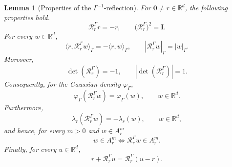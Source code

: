 \documentclass[aap]{imsart}
\theoremstyle{plain}
\newtheorem{lemma}[theorem]{Lemma}
\theoremstyle{definition}
\begin{document}
\begin{lemma}[Properties of the \(\Gamma^{-1}\)-reflection]\label{reflprop}
For \(\mathbf 0 \neq r\in\mathbb R^d\), the following properties hold.
\begin{equation}\label{R1}
	\mathcal R_r^\Gamma r=-r,
	\qquad
	\bigl(\mathcal R_r^\Gamma\bigr)^2=\mathbf I .
\end{equation}	
For every \(w\in\mathbb R^d\),
\begin{equation}\label{R2}
	\langle r,\mathcal R_r^\Gamma w\rangle_\Gamma
	=
	-\langle r,w\rangle_\Gamma,\qquad |\mathcal R_r^\Gamma w|_\Gamma=|w|_\Gamma.
\end{equation}	
Moreover,
\begin{equation}\label{R3}
	\det(\mathcal R_r^\Gamma)=-1,
	\qquad
	|\det(\mathcal R_r^\Gamma)|=1.
\end{equation}
Consequently, for the Gaussian density \(\varphi_\Gamma\),
\begin{equation}\label{R4}
	\varphi_\Gamma(\mathcal R_r^\Gamma w)=\varphi_\Gamma(w),
	\qquad w\in\mathbb R^d .
\end{equation}
Furthermore,
\begin{equation}\label{R5}
	\lambda_r(\mathcal R_r^\Gamma w)
	=
	-\lambda_r(w),
	\qquad w\in\mathbb R^d,
\end{equation}
and hence, for every \(m>0\) and \(w\in A_r^m\)
\begin{equation}\label{R6}
w\in A_r^m\Longleftrightarrow
	\mathcal R_r^\Gamma w\in A_r^m.
\end{equation}	
Finally, for every \(u\in\mathbb R^d\),
\begin{equation}\label{R7}
r+\mathcal R_r^\Gamma u
	=
	\mathcal R_r^\Gamma(u-r).
\end{equation}
\end{lemma}
\end{document}
